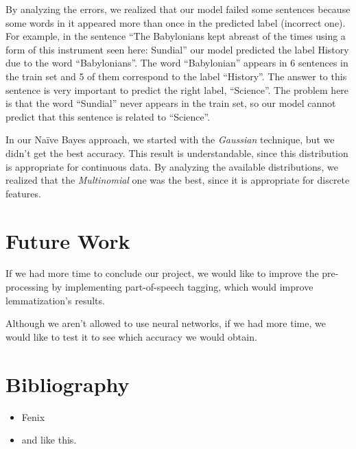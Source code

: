 \documentclass[11pt]{article}
\begin{document}
By analyzing the errors, we realized that our model failed some sentences because some words in it appeared more than once in the predicted label (incorrect one). For example, in the sentence “The Babylonians kept abreast of the times using a form of this instrument seen here: Sundial” our model predicted the label History due to the word “Babylonians”. The word “Babylonian” appears in 6 sentences in the train set and 5 of them correspond to the label “History”. The answer to this sentence is very important to predict the right label, “Science”. The problem here is that the word “Sundial” never appears in the train set, so our model cannot predict that this sentence is related to “Science”.

In our Naïve Bayes approach, we started with the \emph{Gaussian} technique, but we didn't get the best accuracy. This result is understandable, since this distribution is appropriate for continuous data. 
By analyzing the available distributions, we realized that the \emph{Multinomial} one was the best, since it is appropriate for discrete features.


\section{Future Work}

If we had more time to conclude our project, we would like to improve the pre-processing by implementing part-of-speech tagging, which would improve lemmatization’s results.

Although we aren’t allowed to use neural networks, if we had more time, we would like to test it to see which accuracy we would obtain.

\section{Bibliography}

\begin{itemize}
\item Fenix
\item and like this.
\end{itemize}
\end{document}
